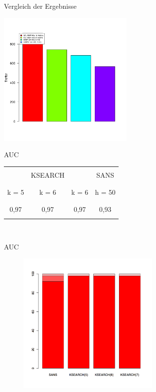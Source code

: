\documentclass[xcolor=dvipsnames, aspectratio=1610]{beamer}
\begin{document}
\begin{frame}{Vergleich der Ergebnisse}
  \begin{center}
    \includegraphics[width=0.5\textwidth]{img/barplot2.png}
  \end{center}
\end{frame}

\begin{frame}{AUC}
  \begin{center}
    \begin{tabular}{ccc|c}
      &&&\\
      &KSEARCH& & SANS\\
      &&&\\
      \hline
      &&&\\
      k = 5 & k = 6 & k = 6 & h = 50 \\
      &&&\\
      \hline
      &&&\\
      0,97 & 0,97 & 0,97 & 0,93 \\
      &&&\\
    \end{tabular}\\
  \end{center}
\end{frame}

\begin{frame}{AUC}
  \begin{figure}[h]
    \includegraphics[height=7cm]{img/auc_dia.png}
  \end{figure}
\end{frame}
\end{document}
